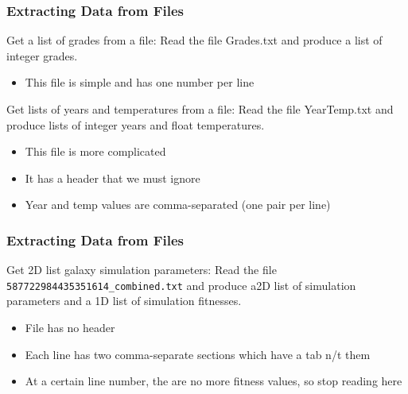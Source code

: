 \documentclass{beamer}
\newcommand{\code}[1]{\texttt{#1}}
\begin{document}
\begin{frame}	
\end{frame}

\begin{frame}	
	\frametitle{Extracting Data from Files}
	
	\begin{exampleblock}{Get a list of grades from a file:}
		Read the file Grades.txt and produce a list of integer grades.
		\begin{itemize}
			\item This file is simple and has one number per line
		\end{itemize}
	\end{exampleblock}
	
	\begin{exampleblock}{Get lists of years and temperatures from a file:}
		Read the file YearTemp.txt and produce lists of integer years and float temperatures.
		\begin{itemize}
			\item This file is more complicated
			\item It has a header that we must ignore
			\item Year and temp values are comma-separated (one pair per line)
		\end{itemize}
	\end{exampleblock}
	
\end{frame}

\begin{frame}	
	\frametitle{Extracting Data from Files}
	
	\begin{exampleblock}{Get 2D list galaxy simulation parameters:}
		Read the file \code{587722984435351614\_combined.txt} and produce a2D list of simulation parameters and a 1D list of simulation fitnesses.
		\begin{itemize}
			\item File has no header
			\item Each line has two comma-separate sections which have a tab n/t them
			\item At a certain line number, the are no more fitness values, so stop reading here
		\end{itemize}
	\end{exampleblock}
	
\end{frame}
\end{document}
